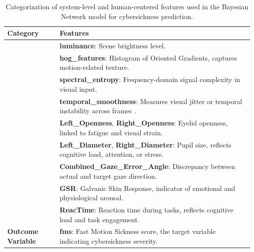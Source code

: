 \documentclass{vgtc}                          %
\begin{document}
\begin{table}[t]
\centering
\tiny
\renewcommand{\arraystretch}{1.2}
\setlength{\tabcolsep}{5pt}
\caption{Categorization of system-level and human-centered features used in the Bayesian Network model for cybersickness prediction.}
\label{tab:feature_summary}
\begin{tabular}{p{1.5cm} p{6.3cm}}
\toprule
\textbf{Category} & \textbf{Features} \\
\midrule

& \textbf{luminance}: Scene brightness level. \\
& \textbf{hog\_features}: Histogram of Oriented Gradients, captures motion-related texture. \\
& \textbf{spectral\_entropy}: Frequency-domain signal complexity in visual input. \\
& \textbf{temporal\_smoothness}: Measures visual jitter or temporal instability across frames \cite{Nasiri8451613}. \\
\midrule

& \textbf{Left\_Openness}, \textbf{Right\_Openness}: Eyelid openness, linked to fatigue and visual strain. \\
& \textbf{Left\_Diameter}, \textbf{Right\_Diameter}: Pupil size, reflects cognitive load, attention, or stress. \\
& \textbf{Combined\_Gaze\_Error\_Angle}: Discrepancy between actual and target gaze direction. \\
& \textbf{GSR}: Galvanic Skin Response, indicator of emotional and physiological arousal. \\
& \textbf{ReacTime}: Reaction time during tasks, reflects cognitive load and task engagement. \\
\midrule

\textbf{Outcome Variable} 
& \textbf{fms}: Fast Motion Sickness score, the target variable indicating cybersickness severity. \\
\bottomrule
\end{tabular}
\end{table}
\end{document}
